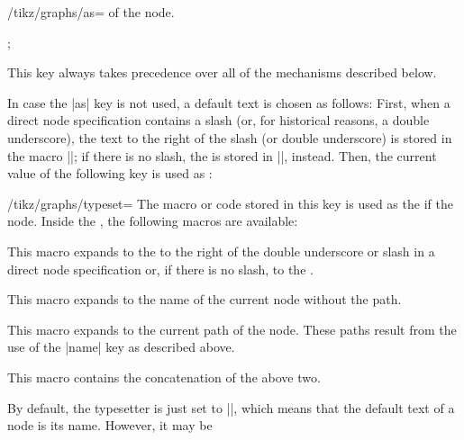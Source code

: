 \begin{itemize}
\begin{key}{/tikz/graphs/as=}
            of the node.
\begin{codeexample}[]
\tikz {};
\end{codeexample}
            This key always takes precedence over all of the mechanisms
            described below.
        \end{key}
        In case the |as| key is not used, a default text is chosen as follows:
        First, when a direct node specification contains a slash (or, for
        historical reasons, a double underscore), the text to the right of the
        slash (or double underscore) is stored in the macro
        |\tikzgraphnodetext|; if there is no slash, the  is
        stored in |\tikzgraphnodetext|, instead. Then, the current value of the
        following key is used as :
        \begin{key}{/tikz/graphs/typeset=}
            The macro or code stored in this key is used as the  if
            the node. Inside the , the following macros are
            available:
            \begin{command}{\tikzgraphnodetext}
                This macro expands to the  to the right of the
                double underscore or slash in a direct node specification or,
                if there is no slash, to the .
            \end{command}
            \begin{command}{\tikzgraphnodename}
                This macro expands to the name of the current node without the
                path.
            \end{command}
            \begin{command}{\tikzgraphnodepath}
                This macro expands to the current path of the node. These paths
                result from the use of the |name| key as described above.
            \end{command}
            \begin{command}{\tikzgraphnodefullname}
                This macro contains the concatenation of the above two.
            \end{command}
        \end{key}
        By default, the typesetter is just set to |\tikzgraphnodetext|, which
        means that the default text of a node is its name. However, it may be

\end{itemize}
